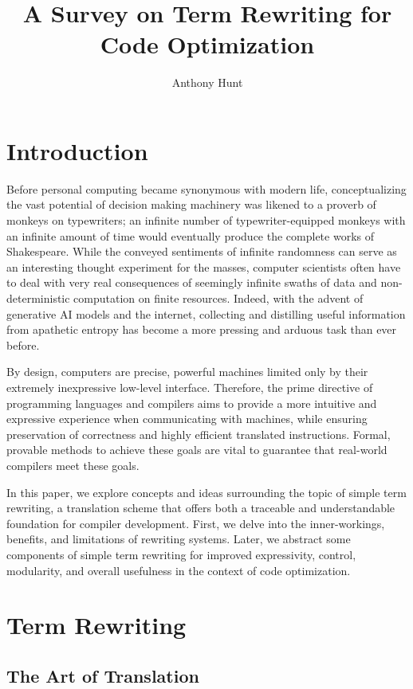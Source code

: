 \documentclass{article}
\title{A Survey on Term Rewriting for Code Optimization}
\author{Anthony Hunt}
\begin{document}
\maketitle
\tableofcontents
\newpage

\section{Introduction}
Before personal computing became synonymous with modern life,
conceptualizing the vast potential of decision making machinery
was likened to a proverb of monkeys on typewriters;
an infinite number of typewriter-equipped monkeys with an infinite amount of time would eventually produce the complete works of Shakespeare.
While the conveyed sentiments of infinite randomness can serve as an interesting thought experiment for the masses,
computer scientists often have to deal with very real consequences of seemingly infinite swaths of data and non-deterministic computation on finite resources.
Indeed, with the advent of generative AI models and the internet, collecting and distilling useful information from apathetic entropy
has become a more pressing and arduous task than ever before.

By design,
computers are precise, powerful machines limited only by
their extremely inexpressive low-level interface.
Therefore, the prime directive of programming languages and compilers
aims to provide a more intuitive and expressive experience when communicating with machines,
while ensuring preservation of correctness and
highly efficient translated instructions.
Formal, provable methods to achieve these goals are vital to guarantee that
real-world compilers meet these goals.

In this paper, we explore concepts and ideas surrounding the topic of simple term rewriting,
a translation scheme that offers both a traceable and understandable foundation for compiler development.
First, we delve into the inner-workings, benefits, and limitations of rewriting systems. Later,
we abstract some components of simple term rewriting for improved expressivity, control,
modularity, and overall usefulness in the context of code optimization.

\section{Term Rewriting}

\subsection{The Art of Translation}
\end{document}

